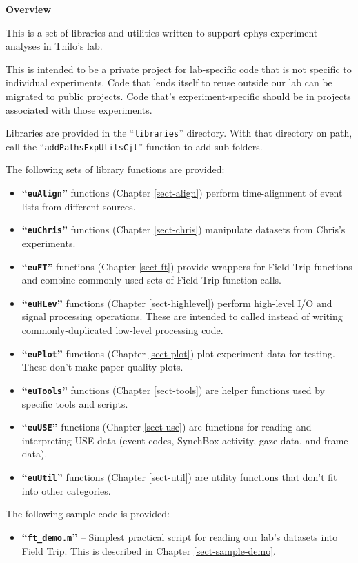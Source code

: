 
\iffalse
%
\chapter{Overview}
%
\else
%
\vspace*{0.75in}
{\Huge \bfseries Overview}
\vspace*{\baselineskip}
\label{sect-over}
%
\fi

This is a set of libraries and utilities written to support ephys experiment
analyses in Thilo's lab.

This is intended to be a private project for lab-specific code that is not
specific to individual experiments. Code that lends itself to reuse outside
our lab can be migrated to public projects. Code that's experiment-specific
should be in projects associated with those experiments.

Libraries are provided in the ``\texttt{libraries}'' directory. With that
directory on path, call the \linebreak ``\texttt{addPathsExpUtilsCjt}''
function to add sub-folders.

The following sets of library functions are provided:
\begin{itemize}
%
\item \textbf{``\texttt{euAlign}''} functions (Chapter \ref{sect-align})
perform time-alignment of event lists from different sources.
%
\item \textbf{``\texttt{euChris}''} functions (Chapter \ref{sect-chris})
manipulate datasets from Chris's experiments.
%
\item \textbf{``\texttt{euFT}''} functions (Chapter \ref{sect-ft})
provide wrappers for Field Trip functions and combine commonly-used sets
of Field Trip function calls.
%
\item \textbf{``\texttt{euHLev}''} functions (Chapter \ref{sect-highlevel})
perform high-level I/O and signal processing operations. These are intended
to called instead of writing commonly-duplicated low-level processing code.
%
\item \textbf{``\texttt{euPlot}''} functions (Chapter \ref{sect-plot})
plot experiment data for testing. These don't make paper-quality plots.
%
\item \textbf{``\texttt{euTools}''} functions (Chapter \ref{sect-tools})
are helper functions used by specific tools and scripts.
%
\item \textbf{``\texttt{euUSE}''} functions (Chapter \ref{sect-use})
are functions for reading and interpreting USE data (event codes, SynchBox
activity, gaze data, and frame data).
%
\item \textbf{``\texttt{euUtil}''} functions (Chapter \ref{sect-util})
are utility functions that don't fit into other categories.
%
\end{itemize}

The following sample code is provided:
\begin{itemize}
%
\item \textbf{``\texttt{ft\_demo.m}''} -- Simplest practical script for
reading our lab's datasets into Field Trip. This is described in Chapter
\ref{sect-sample-demo}.
%
\end{itemize}

%
